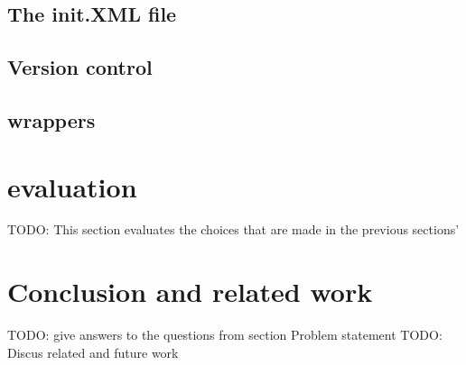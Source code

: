 \documentclass[a4paper,10pt]{scrartcl}
\begin{document}
\subsection{The init.XML file}
\label{subsec:init}

\subsection{Version control}
\label{subsec:versionControl}

\subsection{wrappers}
\label{subsec:wrappers}

\newpage
\section{evaluation}
\label{sec:evaluation}
TODO: This section evaluates the choices that are made in the previous sections'

\newpage
\section{Conclusion and related work}
\label{sec:conclusion}
TODO: give answers to the questions from section Problem statement
TODO: Discus related and future work
\newpage


\end{document}

